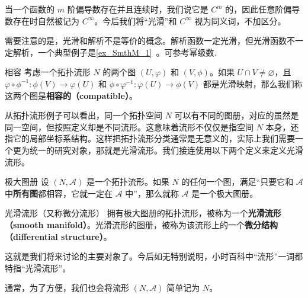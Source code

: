当一个函数的 $m$ 阶偏导数存在并且连续时，我们说它是 $C^m$ 的，因此任意阶偏导数存在时自然被记为 $C^\infty$。今后我们将“光滑”和 $C^\infty$ 视为同义词，不加区分。

需要注意的是，光滑和解析不是等价的概念。解析函数一定光滑，但光滑函数不一定解析，一个典型例子是\autoref{ex_SmthM_1}~。可参考幂级数.

\begin{definition}{相容}
考虑一个拓扑流形 $N$ 的两个图 $(U, \varphi)$ 和 $(V, \phi)$。如果 $U\cap V\not=\varnothing$，且 $\varphi\circ\phi^{-1}:\phi(V)\rightarrow\varphi(U)$ 和 $\phi\circ\varphi^{-1}:\varphi(U)\rightarrow\phi(V)$ 都是光滑映射，那么我们称这两个图是\textbf{相容的（compatible）}。
\end{definition}

从拓扑流形例子可以看出，同一个拓扑空间 $N$ 可以有不同的图册，对应的虽然是同一空间，但按照定义却是不同流形。这意味着流形不仅仅是指空间 $N$ 本身，还指它的局部坐标系结构。这样把拓扑流形分类通常是无意义的，实际上我们需要一个更为统一的研究对象，那就是光滑流形。我们接连使用以下两个定义来定义光滑流形。

\begin{definition}{极大图册}
设 $(N, \mathcal{A})$ 是一个拓扑流形。如果 $N$ 的任何一个图，满足“只要它和 $\mathcal{A}$ 中\textbf{所有图}都相容，它就一定在 $\mathcal{A}$ 中”，那么就称 $\mathcal{A}$ 是一个极大图册。
\end{definition}

\begin{definition}{光滑流形（又称微分流形）}\label{def_Manif_3}
拥有极大图册的拓扑流形，被称为一个\textbf{光滑流形（smooth manifold）}。光滑流形的图册，被称为该流形上的一个\textbf{微分结构（differential structure）}。
\end{definition}


这就是我们将来讨论的主要对象了。今后如无特别说明，小时百科中“流形”一词都特指“光滑流形”。

通常，为了方便，我们也会将流形 $(N, \mathcal{A})$ 简单记为 $N$。





